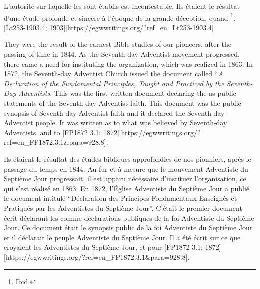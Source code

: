 L'autorité sur laquelle les  sont établis est incontestable. Ils étaient le résultat d'une étude profonde et sincère à l'époque de la grande déception, quand \footnote{Ibid.}. [Lt253-1903.4; 1903][https://egwwritings.org/?ref=en\_Lt253-1903.4]


They were the result of the earnest Bible studies of our pioneers, after the passing of time in 1844. As the Seventh-day Adventist movement progressed, there came a need for instituting the organization, which was realized in 1863. In 1872, the Seventh-day Adventist Church issued the document called “\textit{A Declaration of the Fundamental Principles, Taught and Practiced by the Seventh-Day Adventists}. This was the first written document declaring the  as public statements of the Seventh-day Adventist faith. This document was the public synopsis of Seventh-day Adventist faith and it declared  the Seventh-day Adventist people. It was written  as to what was believed by Seventh-day Adventists,  and to [FP1872 3.1; 1872][https://egwwritings.org/?ref=en\_FP1872.3.1&para=928.8].


Ils étaient le résultat des études bibliques approfondies de nos pionniers, après le passage du temps en 1844. Au fur et à mesure que le mouvement Adventiste du Septième Jour progressait, il est apparu nécessaire d'instituer l'organisation, ce qui s'est réalisé en 1863. En 1872, l'Église Adventiste du Septième Jour a publié le document intitulé “Déclaration des Principes Fondamentaux Enseignés et Pratiqués par les Adventistes du Septième Jour”. C'était le premier document écrit déclarant les  comme déclarations publiques de la foi Adventiste du Septième Jour. Ce document était le synopsis public de la foi Adventiste du Septième Jour et il déclarait  le peuple Adventiste du Septième Jour. Il a été écrit  sur ce que croyaient les Adventistes du Septième Jour,  et pour [FP1872 3.1; 1872][https://egwwritings.org/?ref=en\_FP1872.3.1&para=928.8].


